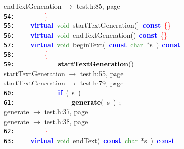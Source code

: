 \documentclass{article}
\begin{document}
\mbox{}{\hfill endTextGeneration $\rightarrow$ test.h:85, page~\pageref{test.h:85}} \\
\mbox{}\texttt{\textcolor{Black}{54:}} \ \ \ \ \ \ \ \ \textcolor{Red}{\}} \\
\mbox{}\texttt{\textcolor{Black}{55:}} \ \ \ \ \textbf{\textcolor{Blue}{virtual}}\ \textcolor{ForestGreen}{void}\ \label{test.h:55}startTextGeneration\textcolor{BrickRed}{()}\ \textbf{\textcolor{Blue}{const}}\ \textcolor{Red}{\{\}} \\
\mbox{}\texttt{\textcolor{Black}{56:}} \ \ \ \ \textbf{\textcolor{Blue}{virtual}}\ \textcolor{ForestGreen}{void}\ \label{test.h:56}endTextGeneration\textcolor{BrickRed}{()}\ \textbf{\textcolor{Blue}{const}}\ \textcolor{Red}{\{\}} \\
\mbox{}\texttt{\textcolor{Black}{57:}} \ \ \ \ \textbf{\textcolor{Blue}{virtual}}\ \textcolor{ForestGreen}{void}\ \label{test.h:57}beginText\textcolor{BrickRed}{(}\ \textbf{\textcolor{Blue}{const}}\ \textcolor{ForestGreen}{char}\ \textcolor{BrickRed}{*}s\ \textcolor{BrickRed}{)}\ \textbf{\textcolor{Blue}{const}} \\
\mbox{}\texttt{\textcolor{Black}{58:}} \ \ \ \ \ \ \ \ \textcolor{Red}{\{} \\
\mbox{}\texttt{\textcolor{Black}{59:}} \ \ \ \ \ \ \ \ \ \ \ \ \textbf{\textcolor{Black}{startTextGeneration}}\textcolor{BrickRed}{()}\ \textcolor{BrickRed}{;} \\
\mbox{}{\hfill startTextGeneration $\rightarrow$ test.h:55, page~\pageref{test.h:55}} \\
\mbox{}{\hfill startTextGeneration $\rightarrow$ test.h:79, page~\pageref{test.h:79}} \\
\mbox{}\texttt{\textcolor{Black}{60:}} \ \ \ \ \ \ \ \ \ \ \ \ \textbf{\textcolor{Blue}{if}}\ \textcolor{BrickRed}{(}\ s\ \textcolor{BrickRed}{)} \\
\mbox{}\texttt{\textcolor{Black}{61:}} \ \ \ \ \ \ \ \ \ \ \ \ \ \ \ \ \textbf{\textcolor{Black}{generate}}\textcolor{BrickRed}{(}\ s\ \textcolor{BrickRed}{)}\ \textcolor{BrickRed}{;} \\
\mbox{}{\hfill generate $\rightarrow$ test.h:37, page~\pageref{test.h:37}} \\
\mbox{}{\hfill generate $\rightarrow$ test.h:38, page~\pageref{test.h:38}} \\
\mbox{}\texttt{\textcolor{Black}{62:}} \ \ \ \ \ \ \ \ \textcolor{Red}{\}} \\
\mbox{}\texttt{\textcolor{Black}{63:}} \ \ \ \ \textbf{\textcolor{Blue}{virtual}}\ \textcolor{ForestGreen}{void}\ \label{test.h:63}endText\textcolor{BrickRed}{(}\ \textbf{\textcolor{Blue}{const}}\ \textcolor{ForestGreen}{char}\ \textcolor{BrickRed}{*}s\ \textcolor{BrickRed}{)}\ \textbf{\textcolor{Blue}{const}} \\
\end{document}
